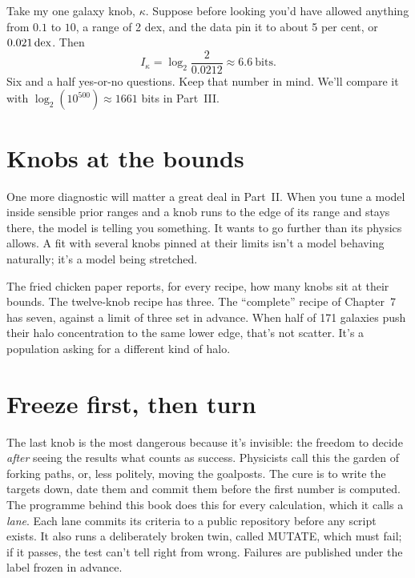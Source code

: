 Take my one galaxy knob, $\kappa$. Suppose before looking you'd have allowed anything from $0.1$ to $10$, a range of 2 dex, and the data pin it to about 5 per cent, or $0.021\,\mathrm{dex}$. Then
\[
I_\kappa=\log_2\frac{2}{0.0212}\approx6.6\ \text{bits}.
\]
Six and a half yes-or-no questions. Keep that number in mind. We'll compare it with $\log_2(10^{500})\approx1661$ bits in Part~III.



\section{Knobs at the bounds}

One more diagnostic will matter a great deal in Part~II. When you tune a model inside sensible prior ranges and a knob runs to the edge of its range and stays there, the model is telling you something. It wants to go further than its physics allows. A fit with several knobs pinned at their limits isn't a model behaving naturally; it's a model being stretched.

The fried chicken paper reports, for every recipe, how many knobs sit at their bounds. The twelve-knob recipe has three. The ``complete'' recipe of Chapter~7 has seven, against a limit of three set in advance. When half of 171 galaxies push their halo concentration to the same lower edge, that's not scatter. It's a population asking for a different kind of halo.




\section{Freeze first, then turn}

The last knob is the most dangerous because it's invisible: the freedom to decide \emph{after} seeing the results what counts as success. Physicists call this the garden of forking paths, or, less politely, moving the goalposts. The cure is to write the targets down, date them and commit them before the first number is computed. The programme behind this book does this for every calculation, which it calls a \emph{lane}. Each lane commits its criteria to a public repository before any script exists. It also runs a deliberately broken twin, called MUTATE, which must fail; if it passes, the test can't tell right from wrong. Failures are published under the label frozen in advance.

